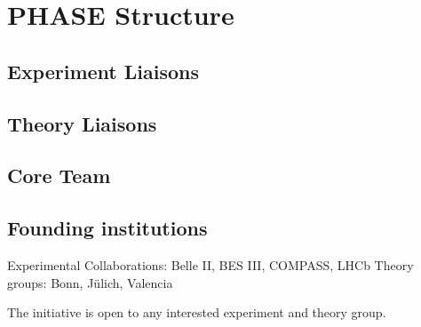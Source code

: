 \section{PHASE Structure}

\subsection{Experiment Liaisons}

\subsection{Theory Liaisons}

\subsection{Core Team}

\subsection{Founding institutions}
Experimental Collaborations: Belle II, BES III, COMPASS, LHCb 
Theory groups: Bonn, J\"ulich, Valencia

The initiative is open to any interested experiment and theory group.